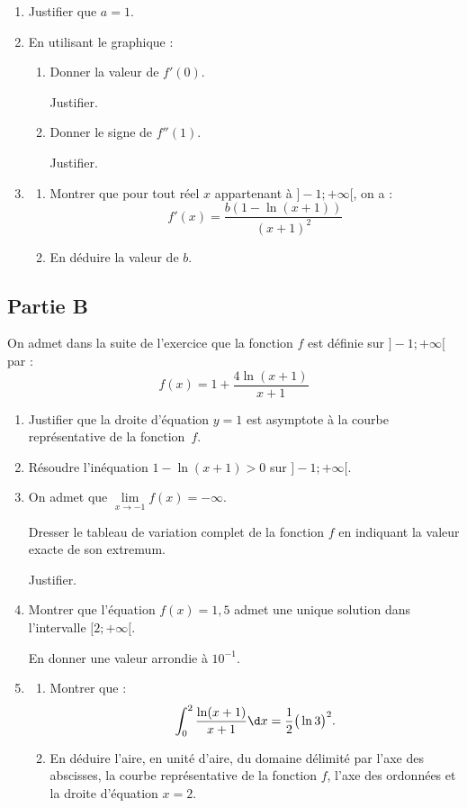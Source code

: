 	\begin{enumerate}
		\item Justifier que $a=1$.

		\item En utilisant le graphique :
		\begin{enumerate}
			\item Donner la valeur de $f'(0)$.

			Justifier.
			\item Donner le signe de $f''(1)$.

			Justifier.
		\end{enumerate}

		\item \begin{enumerate}
			\item Montrer que pour tout réel $x$ appartenant à $]-1 ;+\infty[$, on a :
			\[f'(x)=\dfrac{b(1-\ln (x+1))}{(x+1)^{2}}\]

			\item En déduire la valeur de $b$.
		\end{enumerate}
	\end{enumerate}


	\subsection*{Partie B}
	On admet dans la suite de l'exercice que la fonction $f$ est définie sur $]-1 ;+\infty[$ par :
	\[f(x)=1+\dfrac{4 \ln (x+1)}{x+1}\]

	\begin{enumerate}
		\item Justifier que la droite d'équation \quad $y=1$ \quad est asymptote à la courbe représentative de la fonction~$f$.

		\item Résoudre l'inéquation \quad $1-\ln (x+1)>0$ \quad sur $]-1 ;+\infty[$.

		\item On admet que \quad $\lim\limits_{x \to -1} f(x)=-\infty$.

		Dresser le tableau de variation complet de la fonction $f$ en indiquant la valeur exacte de son extremum.

		Justifier.

		\item Montrer que l'équation \quad $f(x)=1,5$ \quad admet une unique solution dans l'intervalle $[2 ; +\infty[$.

		En donner une valeur arrondie à $10^{-1}$.

		\item \begin{enumerate}
			\item Montrer que :
			\[\int_{0}^{2} \dfrac{\ln (x+1)}{x+1} \d x=\dfrac{1}{2}\big(\ln 3\big)^{2}.\]

			\item En déduire l'aire, en unité d'aire, du domaine délimité par l'axe des abscisses, la courbe représentative de la fonction $f$, l'axe des ordonnées et la droite d'équation \quad $x=2$.
		\end{enumerate}
	\end{enumerate}
